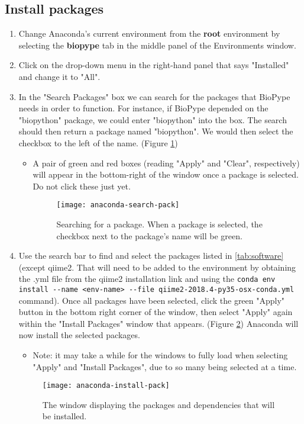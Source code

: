 \subsection*{Install packages}
    \begin{enumerate}
        \item Change Anaconda's current environment from the \textbf{root} environment by selecting the \textbf{biopype} tab in the middle panel of the Environments window.
        \item Click on the drop-down menu in the right-hand panel that says "Installed" and change it to "All".
        \item In the "Search Packages" box we can search for the packages that BioPype needs in order to function. For instance, if BioPype depended on the "biopython" package, we could enter "biopython" into the box. The search should then return a package named "biopython". We would then select the checkbox to the left of the name. (Figure \ref{anaconda-search-pack})
        \begin{itemize}
            \item A pair of green and red boxes (reading "Apply" and "Clear", respectively) will appear in the bottom-right of the window once a package is selected. Do not click these just yet. 
    \begin{figure}[hbtp]
        \begin{center}
        \texttt{[image: anaconda-search-pack]}
        \caption{Searching for a package. When a package is selected, the checkbox next to the package's name will be green.}
        \label{anaconda-search-pack}
        \end{center}
    \end{figure}
        \end{itemize}
        \item Use the search bar to find and select the packages listed in \autoref{tab:software} (except qiime2. That will need to be added to the environment by obtaining the .yml file from the qiime2 installation link and using the \verb|conda env install --name <env-name> --file qiime2-2018.4-py35-osx-conda.yml| command). Once all packages have been selected, click the green "Apply" button in the bottom right corner of the window, then select "Apply" again within the "Install Packages" window that appears. (Figure \ref{anaconda-install-pack}) Anaconda will now install the selected packages.
        \begin{itemize}
        \item Note: it may take a while for the windows to fully load when selecting "Apply" and "Install Packages", due to so many being selected at a time. 
        \end{itemize}
    \begin{figure}[hbtp]
        \begin{center}
        \texttt{[image: anaconda-install-pack]}
        \caption{The window displaying the packages and dependencies that will be installed.}
        \label{anaconda-install-pack}
        \end{center}
    \end{figure}
    

\end{enumerate}

